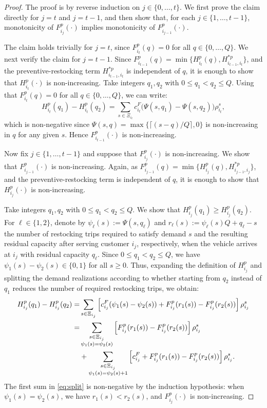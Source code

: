 \documentclass[10pt,a4paper]{amsart}
\newcommand{\rev}[1]{{\color{black}#1}}
\begin{document}
\begin{proof}
\rev{The proof is by reverse induction on $j\in\{0,\dots,t\}$. We first prove the claim directly for $j=t$ and $j=t-1$, and then show that, for each $j\in\{1,\dots,t-1\}$, monotonicity of $F^p_{i_j}(\cdot)$ implies monotonicity of
$F^p_{i_{j-1}}(\cdot)$.

The claim holds trivially for
$j=t$, since $F^p_{i_t}(q)=0$ for all $q \in \{0,\dots,Q\}$. We next verify the claim for
$j=t-1$. Since $F^p_{i_{t-1}}(q)
=
\min\{H^p_{i_t}(q),H^{*p}_{i_{t-1},i_t}\}$,
and the preventive-restocking term $H^{*p}_{i_{t-1},i_t}$ is independent of $q$, it is enough to
show that $H^p_{i_t}(\cdot)$ is non-increasing. Take integers $q_1,q_2$ with $0\le q_1<q_2\le Q$. Using that $F^p_{i_t}(q)=0$ for all $q \in \{0,\dots,Q\}$, we can write:
\[
H^p_{i_t}(q_1)-H^p_{i_t}(q_2)
=
\sum_{s\in\Xi_{i_t}}
c^F_{i_t}\bigl(\Psi(s,q_1)-\Psi(s,q_2)\bigr)\rho_{i_t}^s,
\]
which is non-negative since $\Psi(s,q)=\max\{\lceil(s - q)/Q\rceil,0\}$ is non-increasing in $q$ for any given $s$. Hence
$F^p_{i_{t-1}}(\cdot)$ is non-increasing. 

Now fix $j\in\{1,\dots,t-1\}$ and suppose that $F^p_{i_j}(\cdot)$ is non-increasing. We show that $F^p_{i_{j-1}}(\cdot)$ is non-increasing. Again, as $F^p_{i_{j-1}}(q) = \min\{H^p_{i_j}(q),H^{*p}_{i_{j-1},i_j}\}$,
and the preventive-restocking term is independent of $q$, it is enough to show that $H^p_{i_j}(\cdot)$ is non-increasing.

Take integers $q_1,q_2$ with $0\le q_1<q_2\le Q$. We show that $H^p_{i_j}(q_1)\ge H^p_{i_j}(q_2)$. For $\ell\in\{1,2\}$, denote by $\psi_\ell(s):=\Psi(s,q_\ell)$ and $r_\ell(s):=\psi_\ell(s)Q+q_\ell-s$ the number of restocking trips required to satisfy demand $s$ and the resulting residual capacity after serving customer $i_j$, respectively, when the vehicle arrives at $i_j$ with residual capacity $q_\ell$. Since $0\le q_1<q_2\le Q$, we have $\psi_1(s)-\psi_2(s)\in\{0,1\}$ for all $s\ge 0$. Thus, expanding the definition of $H^p_{i_j}$ and splitting the demand realizations according to whether starting from $q_2$ instead of $q_1$ reduces the number of required restocking trips, we obtain:
\begin{align}
H^p_{i_j}(q_1)-H^p_{i_j}(q_2)
=&
\sum_{s\in\Xi_{i_j}}
\left[
c^F_{i_j}(\psi_1(s)-\psi_2(s))
+
F^p_{i_j}(r_1(s))-F^p_{i_j}(r_2(s))
\right]\rho_{i_j}^s
\notag\\
=&
\sum_{\substack{s\in\Xi_{i_j}\\ \psi_1(s)=\psi_2(s)}}
\left[
F^p_{i_j}(r_1(s))-F^p_{i_j}(r_2(s))
\right]\rho_{i_j}^s
\notag\\
&+
\sum_{\substack{s\in\Xi_{i_j}\\ \psi_1(s)=\psi_2(s)+1}}
\left[
c^F_{i_j}
+
F^p_{i_j}(r_1(s))-F^p_{i_j}(r_2(s))
\right]\rho_{i_j}^s .
\label{eq:split}
\end{align}
The first sum in \eqref{eq:split} is non-negative by the induction hypothesis: when
$\psi_1(s)=\psi_2(s)$, we have $r_1(s)<r_2(s)$, and
$F^p_{i_j}(\cdot)$ is non-increasing.

}
\end{proof}
\end{document}
